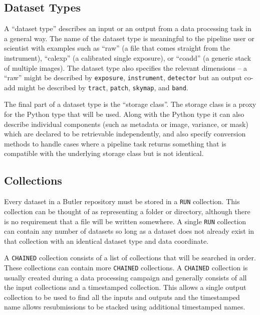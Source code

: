 \subsection{Dataset Types}

A ``dataset type'' describes an input or an output from a data processing task in a general way.
The name of the dataset type is meaningful to the pipeline user or scientist with examples such as ``raw'' (a file that comes straight from the instrument), ``calexp'' (a calibrated single exposure), or ``coadd'' (a generic stack of multiple images).
The dataset type also specifies the relevant dimensions -- a ``raw'' might be described by \texttt{exposure}, \texttt{instrument}, \texttt{detector} but an output co-add might be described by \texttt{tract}, \texttt{patch}, \texttt{skymap}, and \texttt{band}.

The final part of a dataset type is the ``storage class''.
The storage class is a proxy for the Python type that will be used.
Along with the Python type it can also describe individual components (such as metadata or image, variance, or mask) which are declared to be retrievable independently, and also specify conversion methods to handle cases where a pipeline task returns something that is compatible with the underlying storage class but is not identical.

\subsection{Collections}

Every dataset in a Butler repository must be stored in a \texttt{RUN} collection.
This collection can be thought of as representing a folder or directory, although there is no requirement that a file will be written somewhere.
A single \texttt{RUN} collection can contain any number of datasets so long as a dataset does not already exist in that collection with an identical dataset type and data coordinate.

A \texttt{CHAINED} collection consists of a list of collections that will be searched in order.
These collections can contain more \texttt{CHAINED} collections.
A \texttt{CHAINED} collection is usually created during a data processing campaign and generally consists of all the input collections and a timestamped collection.
This allows a single output collection to be used to find all the inputs and outputs and the timestamped name allows resubmissions to be stacked using additional timestamped names.

